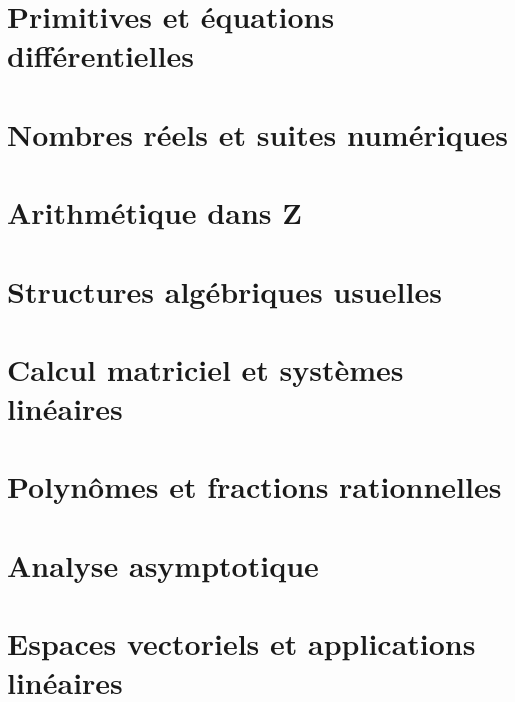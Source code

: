\documentclass[10pt,a4paper]{report}
\theoremstyle{plain}
\theoremstyle{definition}
\theoremstyle{remark}
\begin{document}
\chapter{Primitives et équations différentielles}

    
        
\chapter{Nombres réels et suites numériques}

    

\chapter{Arithmétique dans $\mathbf{Z}$}

    

\chapter{Structures algébriques usuelles}

    

\chapter{Calcul matriciel et systèmes linéaires}

    

\chapter{Polynômes et fractions rationnelles}

    
    
\chapter{Analyse asymptotique}

    
        
\chapter{Espaces vectoriels et applications linéaires}

    
\end{document}

